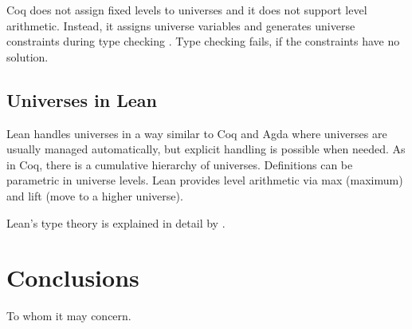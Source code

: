 \documentclass[manuscript,screen,review,anonymous]{acmart}
\begin{document}
Coq does not assign fixed levels to universes and it does not support
level arithmetic. Instead, it assigns 
universe variables and generates universe constraints during type
checking \cite{Herbelin2005TypeIW}. Type checking fails, if the constraints have no solution.


\subsection{Universes in Lean}
\label{sec:universes-lean}


Lean handles universes in a way similar to Coq and Agda where
universes are usually managed automatically, but explicit handling is possible when needed.
As in Coq, there is a cumulative hierarchy of universes.
Definitions can be parametric in universe levels.
Lean provides level arithmetic via max (maximum) and lift (move to a
higher universe).


Lean's type theory is explained in detail by \citet{carneiro19:_type_theor_lean}.



\section{Conclusions}
\label{sec:conclusions}


\begin{acks}
  To whom it may concern.
\end{acks}



\end{document}
